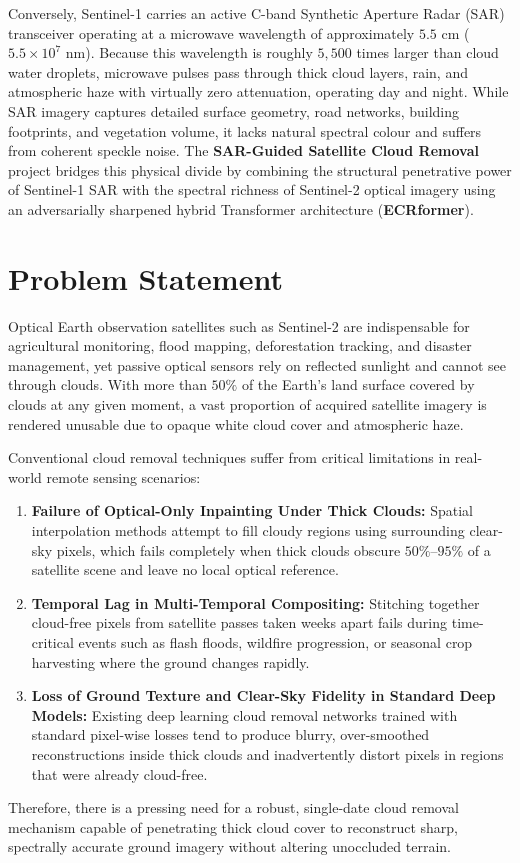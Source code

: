 \documentclass[12pt,a4paper]{report}
\begin{document}
Conversely, Sentinel-1 carries an active C-band Synthetic Aperture Radar (SAR) transceiver operating at a microwave wavelength of approximately $5.5\text{ cm}$ ($5.5\times 10^7\text{ nm}$). Because this wavelength is roughly $5{,}500$ times larger than cloud water droplets, microwave pulses pass through thick cloud layers, rain, and atmospheric haze with virtually zero attenuation, operating day and night. While SAR imagery captures detailed surface geometry, road networks, building footprints, and vegetation volume, it lacks natural spectral colour and suffers from coherent speckle noise. The \textbf{SAR-Guided Satellite Cloud Removal} project bridges this physical divide by combining the structural penetrative power of Sentinel-1 SAR with the spectral richness of Sentinel-2 optical imagery using an adversarially sharpened hybrid Transformer architecture (\textbf{ECRformer}).

\section{Problem Statement}
Optical Earth observation satellites such as Sentinel-2 are indispensable for agricultural monitoring, flood mapping, deforestation tracking, and disaster management, yet passive optical sensors rely on reflected sunlight and cannot see through clouds. With more than $50\%$ of the Earth's land surface covered by clouds at any given moment, a vast proportion of acquired satellite imagery is rendered unusable due to opaque white cloud cover and atmospheric haze.

Conventional cloud removal techniques suffer from critical limitations in real-world remote sensing scenarios:
\begin{enumerate}
    \item \textbf{Failure of Optical-Only Inpainting Under Thick Clouds:} Spatial interpolation methods attempt to fill cloudy regions using surrounding clear-sky pixels, which fails completely when thick clouds obscure $50\%$--$95\%$ of a satellite scene and leave no local optical reference.
    \item \textbf{Temporal Lag in Multi-Temporal Compositing:} Stitching together cloud-free pixels from satellite passes taken weeks apart fails during time-critical events such as flash floods, wildfire progression, or seasonal crop harvesting where the ground changes rapidly.
    \item \textbf{Loss of Ground Texture and Clear-Sky Fidelity in Standard Deep Models:} Existing deep learning cloud removal networks trained with standard pixel-wise losses tend to produce blurry, over-smoothed reconstructions inside thick clouds and inadvertently distort pixels in regions that were already cloud-free.
\end{enumerate}
Therefore, there is a pressing need for a robust, single-date cloud removal mechanism capable of penetrating thick cloud cover to reconstruct sharp, spectrally accurate ground imagery without altering unoccluded terrain.
\end{document}
